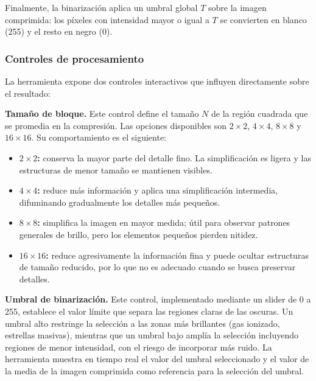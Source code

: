 \documentclass[11pt]{article}
\begin{document}
Finalmente, la binarización aplica un umbral global $T$ sobre la imagen comprimida: los píxeles con intensidad mayor o igual a $T$ se convierten en blanco (255) y el resto en negro (0).


\subsubsection{Controles de procesamiento}

La herramienta expone dos controles interactivos que influyen directamente sobre el resultado:

\textbf{Tamaño de bloque.} Este control define el tamaño $N$ de la región cuadrada que se promedia en la compresión. Las opciones disponibles son $2 \times 2$, $4 \times 4$, $8 \times 8$ y $16 \times 16$. Su comportamiento es el siguiente:
\begin{itemize}
    \item \textbf{$2 \times 2$:} conserva la mayor parte del detalle fino. La simplificación es ligera y las estructuras de menor tamaño se mantienen visibles.
    \item \textbf{$4 \times 4$:} reduce más información y aplica una simplificación intermedia, difuminando gradualmente los detalles más pequeños.
    \item \textbf{$8 \times 8$:} simplifica la imagen en mayor medida; útil para observar patrones generales de brillo, pero los elementos pequeños pierden nitidez.
    \item \textbf{$16 \times 16$:} reduce agresivamente la información fina y puede ocultar estructuras de tamaño reducido, por lo que no es adecuado cuando se busca preservar detalles.
\end{itemize}

\textbf{Umbral de binarización.} Este control, implementado mediante un slider de 0 a 255, establece el valor límite que separa las regiones claras de las oscuras. Un umbral alto restringe la selección a las zonas más brillantes (gas ionizado, estrellas masivas), mientras que un umbral bajo amplía la selección incluyendo regiones de menor intensidad, con el riesgo de incorporar más ruido. La herramienta muestra en tiempo real el valor del umbral seleccionado y el valor de la media de la imagen comprimida como referencia para la selección del umbral.
\end{document}

